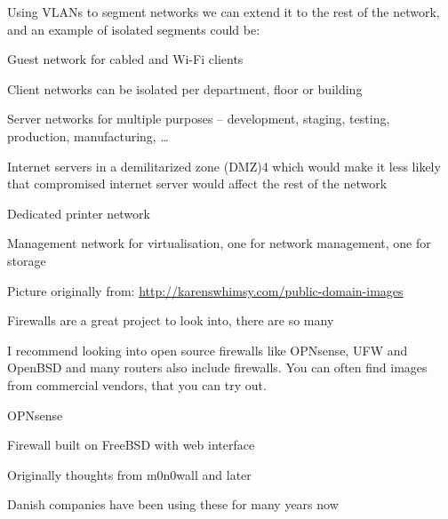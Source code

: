 \documentclass[Screen16to9,17pt]{foils}
\begin{document}

Using VLANs to segment networks we can extend it to the rest of the network, and an example of isolated segments could be:
\begin{list2}
\item Guest network for cabled and Wi-Fi clients
\item Client networks can be isolated per department, floor or building
\item Server networks for multiple purposes – development, staging, testing, production, manufacturing, …
\item Internet servers in a demilitarized zone (DMZ)4 which would make it less likely that compromised internet
server would affect the rest of the network
\item Dedicated printer network
\item Management network for virtualisation, one for network management, one for storage
\end{list2}



\centerline{Picture originally from: \url{http://karenswhimsy.com/public-domain-images}}



Firewalls are a great project to look into, there are so many \smiley

I recommend looking into open source firewalls like OPNsense, UFW and OpenBSD and many routers also include firewalls. You can often find images from commercial vendors, that you can try out.





\begin{list2}
\item OPNsense 
\item Firewall built on FreeBSD with web interface
\item Originally thoughts from m0n0wall and later \\
\item Danish companies have been using these for many years now
\end{list2}
\end{document}
